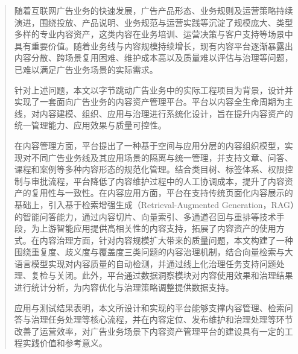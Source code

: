 \begin{abstract}

随着互联网广告业务的快速发展，广告产品形态、业务规则及运营策略持续演进，围绕投放、产品说明、业务规范与运营实践等沉淀了规模庞大、类型多样的专业内容资产，这类内容在业务培训、运营决策与客户支持等场景中具有重要价值。随着业务线与内容规模持续增长，现有内容平台逐渐暴露出内容分散、跨场景复用困难、维护成本高以及质量难以评估与治理等问题，已难以满足广告业务场景的实际需求。

针对上述问题，本文以字节跳动广告业务中的实际工程项目为背景，设计并实现了一套面向广告业务的内容资产管理平台。平台以内容全生命周期为主线，对内容建模、组织、应用与治理进行系统化设计，旨在提升内容资产的统一管理能力、应用效果与质量可控性。

在内容管理方面，平台提出了一种基于空间与应用分层的内容组织模型，实现对不同广告业务线及其应用场景的隔离与统一管理，并支持文章、问答、课程和案例等多种内容形态的规范化管理。结合类目树、标签体系、权限控制与审批流程，平台降低了内容维护过程中的人工协调成本，提升了内容资产的复用性与一致性。在内容应用方面，平台在支持传统页面化内容展示的基础上，引入基于检索增强生成（Retrieval-Augmented Generation，RAG）的智能问答能力，通过内容切片、向量索引、多通道召回与重排等技术手段，为上游智能应用提供高相关性的内容支持，拓展了内容资产的使用方式。在内容治理方面，针对内容规模扩大带来的质量问题，本文构建了一种围绕重复度、歧义度与覆盖度三类问题的内容治理机制，结合向量检索与大语言模型实现对内容质量的自动检测，并通过线上化治理任务支持问题处理、复检与关闭。此外，平台通过数据洞察模块对内容使用效果和治理结果进行统计分析，为内容优化与治理策略调整提供数据支持。

应用与测试结果表明，本文所设计和实现的平台能够支撑内容管理、检索问答与治理任务处理等核心流程，并在内容定位、发布维护和治理处理等环节改善了运营效率，对广告业务场景下内容资产管理平台的建设具有一定的工程实践价值和参考意义。

\end{abstract}


